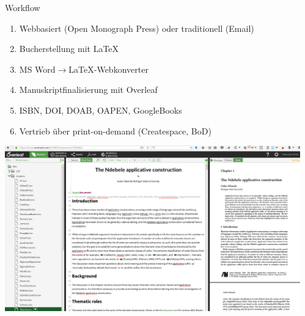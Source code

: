 \documentclass[final,utf8]{beamer}
\begin{document}
\begin{frame}{}
\begin{columns}[t]
\begin{column}{.45\linewidth}
 

 

  \end{column}


  \begin{column}{.45\linewidth}
    





    \begin{block}{Workflow} 
	\begin{enumerate} 
	    \item Webbasiert (Open Monograph Press) oder traditionell (Email)
	    \item Bucherstellung mit {\LaTeX}
	    \item MS Word$\to${\LaTeX}-Webkonverter
	    \item Manuskriptfinalisierung mit Overleaf
	    \item ISBN, DOI, DOAB, OAPEN, GoogleBooks
	    \item Vertrieb \"uber print-on-demand (Createspace, BoD)
	\end{enumerate}  
     \includegraphics[width=.9\textwidth]{overleaf.png}
  
    \end{block} 




\end{column}
\end{columns}
\end{frame}
\end{document}
